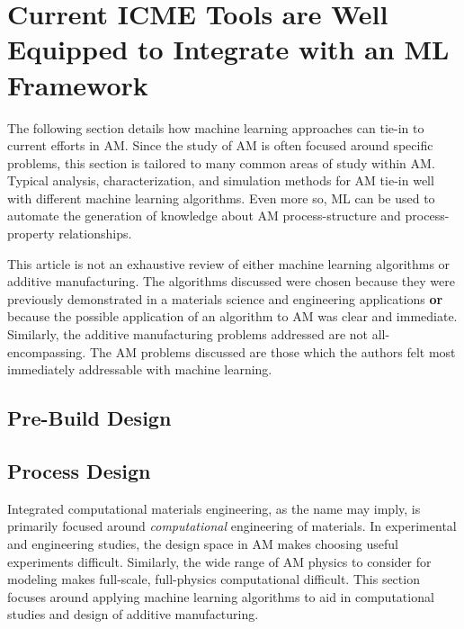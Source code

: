 \section{Current ICME Tools are Well Equipped to Integrate with an ML Framework}
The following section details how machine learning approaches can tie-in to current efforts in AM. Since the study of AM is often focused around specific problems, this section is tailored to many common areas of study within AM. Typical analysis, characterization, and simulation methods for AM tie-in well with different machine learning algorithms. Even more so, ML can be used to automate the generation of knowledge about AM process-structure and process-property relationships. 

This article is not an exhaustive review of either machine learning algorithms or additive manufacturing. The algorithms discussed were chosen because they were previously demonstrated in a materials science and engineering applications \textbf{or} because the possible application of an algorithm to AM was clear and immediate. Similarly, the additive manufacturing problems addressed are not all-encompassing. The AM problems discussed are those which the authors felt most immediately addressable with machine learning. 

\subsection{Pre-Build Design}




\subsection{Process Design}
Integrated computational materials engineering, as the name may imply, is primarily focused around \textit{computational} engineering of materials. In experimental and engineering studies, the design space in AM makes choosing useful experiments difficult. Similarly, the wide range of AM physics to consider for modeling makes full-scale, full-physics computational difficult. This section focuses around applying machine learning algorithms to aid in computational studies and design of additive manufacturing. 




